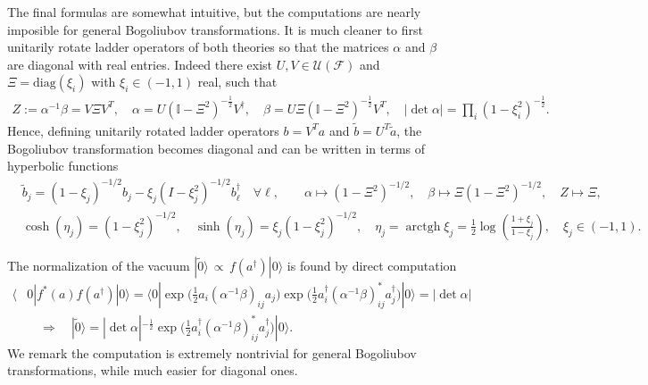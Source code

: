 \documentclass[../QFT_main.tex]{subfiles}
\begin{document}
\begin{mytheorem}
The final formulas are somewhat intuitive, but the computations are nearly imposible for general Bogoliubov transformations.
It is much cleaner to first unitarily rotate ladder operators of both theories so that the matrices $\alpha$ and $\beta$ are diagonal with real entries.
Indeed there exist $U,V\in \mathcal{U}(\mathcal{F})$ and $\Xi=\text{diag}(\xi_i)$ with $\xi_i\in(-1,1)$ real, such that
{\small\begin{align}
    Z:= \alpha^{-1}\beta = V \Xi V^T, \quad \alpha = U \left(\mathbb{I}-\Xi^2\right)^{-\tfrac12} V^\dagger,\quad  \beta= U \Xi \left(\mathbb{I}-\Xi^2\right)^{-\tfrac12} V^T,\quad |\det\alpha| = \prod_i (1-\xi_i^2)^{-\tfrac12}.
\end{align}}
Hence, defining unitarily rotated ladder operators $b= V^T a$ and $\tilde{b}= U^T\tilde{a}$, the Bogoliubov transformation becomes diagonal and can be written in terms of hyperbolic functions
{\small\begin{align}
    &\tilde{b}_j =  (1-\xi_j)^{-1/2} b_j - \xi_j (I - \xi_j^2)^{-1/2} b^\dagger_\ell \quad \forall\ell,\qquad
    \alpha\mapsto (1-\Xi^2)^{-1/2}, \quad \beta\mapsto \Xi (1-\Xi^2)^{-1/2}, \quad Z\mapsto \Xi,\\[3pt]
    &\cosh(\eta_j)= (1-\xi_j^2)^{-1/2},
     \quad \sinh(\eta_j) = \xi_j (1-\xi_j^2)^{-1/2},\quad \eta_j = \operatorname{arctgh}\xi_j= \tfrac12 \log\left(\tfrac{1+\xi_j}{1-\xi_j}\right),\quad \xi_j\in(-1,1).
\end{align}}

The normalization of the vacuum $|\tilde{0}\rangle \,\propto\, f(a^\dagger)|0\rangle$ is found by direct computation
{\small\begin{align}\label{eq:bogoliubov_vacuum_normalization}
    \langle& 0| f^*(a) f(a^\dagger) |0\rangle = \langle 0| \exp\Big(\tfrac{1}{2} a_i (\alpha^{-1}\beta)_{ij} a_j\Big) \exp\Big(\tfrac{1}{2} a^\dagger_i (\alpha^{-1}\beta)^*_{ij} a^\dagger_j\Big) |0\rangle = |\det\alpha|\\[3pt]
    &\quad\Rightarrow\quad |\tilde{0}\rangle = |\det\alpha|^{-\tfrac12}\exp\Big(\tfrac{1}{2} a^\dagger_i (\alpha^{-1}\beta)^*_{ij} a^\dagger_j\Big) |0\rangle.
\end{align}}
We remark the computation is extremely nontrivial for general Bogoliubov transformations, while much easier for diagonal ones.


\end{mytheorem}
\end{document}
